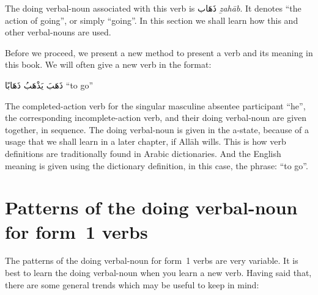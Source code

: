 \documentclass[
  10pt,
]{book}
\begin{document}
The doing verbal-noun associated with this verb is \foreignlanguage{arabic}{ذَهَاب} \emph{ẕahāb}. It denotes \enquote{the action of going}, or simply \enquote{going}. In this section we shall learn how this and other verbal-nouns are used.

Before we proceed, we present a new method to present a verb and its meaning in this book.
We will often give a new verb in the format:

\foreignlanguage{arabic}{ذَهَبَ يَذْهَبُ ذَهَابًا} \enquote{to go}

The completed-action verb for the singular masculine absentee participant \enquote{he}, the corresponding incomplete-action verb, and their doing verbal-noun are given together, in sequence. The doing verbal-noun is given in the a-state, because of a usage that we shall learn in a later chapter, if Allāh wills. This is how verb definitions are traditionally found in Arabic dictionaries. And the English meaning is given using the dictionary definition, in this case, the phrase: \enquote{to go}.

\section{Patterns of the doing verbal-noun for form~1 verbs}\label{patterns-of-the-doing-verbal-noun-for-form-1-verbs}

The patterns of the doing verbal-noun for form~1 verbs are very variable. It is best to learn the doing verbal-noun when you learn a new verb. Having said that, there are some general trends which may be useful to keep in mind:
\end{document}
